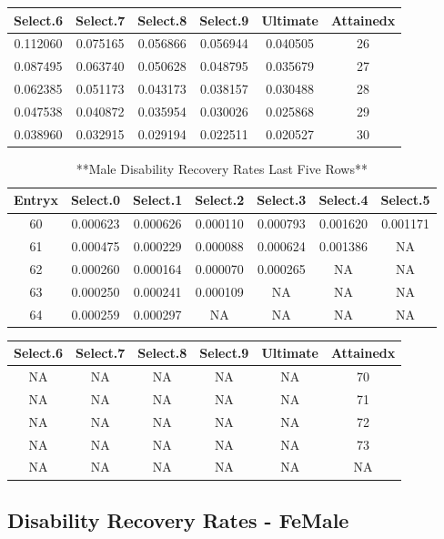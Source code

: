 \documentclass[
]{book}
\begin{document}
\begin{tabular}{c|c|c|c|c|c}
\hline
Select.6 & Select.7 & Select.8 & Select.9 & Ultimate & Attainedx\\
\hline
0.112060 & 0.075165 & 0.056866 & 0.056944 & 0.040505 & 26\\
\hline
0.087495 & 0.063740 & 0.050628 & 0.048795 & 0.035679 & 27\\
\hline
0.062385 & 0.051173 & 0.043173 & 0.038157 & 0.030488 & 28\\
\hline
0.047538 & 0.040872 & 0.035954 & 0.030026 & 0.025868 & 29\\
\hline
0.038960 & 0.032915 & 0.029194 & 0.022511 & 0.020527 & 30\\
\hline
\end{tabular}

\begin{table}

\caption{\label{tab:unnamed-chunk-38}**Male Disability Recovery Rates Last Five Rows**}
\centering
\begin{tabular}[t]{c|c|c|c|c|c|c}
\hline
Entryx & Select.0 & Select.1 & Select.2 & Select.3 & Select.4 & Select.5\\
\hline
60 & 0.000623 & 0.000626 & 0.000110 & 0.000793 & 0.001620 & 0.001171\\
\hline
61 & 0.000475 & 0.000229 & 0.000088 & 0.000624 & 0.001386 & NA\\
\hline
62 & 0.000260 & 0.000164 & 0.000070 & 0.000265 & NA & NA\\
\hline
63 & 0.000250 & 0.000241 & 0.000109 & NA & NA & NA\\
\hline
64 & 0.000259 & 0.000297 & NA & NA & NA & NA\\
\hline
\end{tabular}
\end{table}

\begin{tabular}{c|c|c|c|c|c}
\hline
Select.6 & Select.7 & Select.8 & Select.9 & Ultimate & Attainedx\\
\hline
NA & NA & NA & NA & NA & 70\\
\hline
NA & NA & NA & NA & NA & 71\\
\hline
NA & NA & NA & NA & NA & 72\\
\hline
NA & NA & NA & NA & NA & 73\\
\hline
NA & NA & NA & NA & NA & NA\\
\hline
\end{tabular}

\hypertarget{disability-recovery-rates---female}{%
\subsection*{Disability Recovery Rates - FeMale}\label{disability-recovery-rates---female}}
\end{document}
